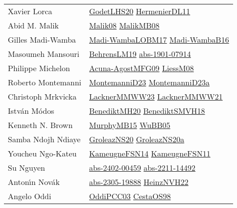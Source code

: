 {\begin{longtable}{p{4cm}p{20cm}}
Xavier Lorca & \href{papers/GodetLHS20.pdf}{GodetLHS20}\cite{GodetLHS20} \href{papers/HermenierDL11.pdf}{HermenierDL11}\cite{HermenierDL11} \\
Abid M. Malik & \href{}{Malik08}\cite{Malik08} \href{articles/MalikMB08.pdf}{MalikMB08}\cite{MalikMB08} \\
Gilles Madi{-}Wamba & \href{papers/Madi-WambaLOBM17.pdf}{Madi-WambaLOBM17}\cite{Madi-WambaLOBM17} \href{papers/Madi-WambaB16.pdf}{Madi-WambaB16}\cite{Madi-WambaB16} \\
Masoumeh Mansouri & \href{papers/BehrensLM19.pdf}{BehrensLM19}\cite{BehrensLM19} \href{articles/abs-1901-07914.pdf}{abs-1901-07914}\cite{abs-1901-07914} \\
Philippe Michelon & \href{papers/Acuna-AgostMFG09.pdf}{Acuna-AgostMFG09}\cite{Acuna-AgostMFG09} \href{articles/LiessM08.pdf}{LiessM08}\cite{LiessM08} \\
Roberto Montemanni & \href{articles/MontemanniD23.pdf}{MontemanniD23}\cite{MontemanniD23} \href{articles/MontemanniD23a.pdf}{MontemanniD23a}\cite{MontemanniD23a} \\
Christoph Mrkvicka & \href{articles/LacknerMMWW23.pdf}{LacknerMMWW23}\cite{LacknerMMWW23} \href{papers/LacknerMMWW21.pdf}{LacknerMMWW21}\cite{LacknerMMWW21} \\
Istv{\'{a}}n M{\'{o}}dos & \href{articles/BenediktMH20.pdf}{BenediktMH20}\cite{BenediktMH20} \href{papers/BenediktSMVH18.pdf}{BenediktSMVH18}\cite{BenediktSMVH18} \\
Kenneth N. Brown & \href{papers/MurphyMB15.pdf}{MurphyMB15}\cite{MurphyMB15} \href{papers/WuBB05.pdf}{WuBB05}\cite{WuBB05} \\
Samba Ndojh Ndiaye & \href{papers/GroleazNS20.pdf}{GroleazNS20}\cite{GroleazNS20} \href{papers/GroleazNS20a.pdf}{GroleazNS20a}\cite{GroleazNS20a} \\
Youcheu Ngo{-}Kateu & \href{articles/KameugneFSN14.pdf}{KameugneFSN14}\cite{KameugneFSN14} \href{papers/KameugneFSN11.pdf}{KameugneFSN11}\cite{KameugneFSN11} \\
Su Nguyen & \href{articles/abs-2402-00459.pdf}{abs-2402-00459}\cite{abs-2402-00459} \href{articles/abs-2211-14492.pdf}{abs-2211-14492}\cite{abs-2211-14492} \\
Anton{\'{\i}}n Nov{\'{a}}k & \href{articles/abs-2305-19888.pdf}{abs-2305-19888}\cite{abs-2305-19888} \href{articles/HeinzNVH22.pdf}{HeinzNVH22}\cite{HeinzNVH22} \\
Angelo Oddi & \href{papers/OddiPCC03.pdf}{OddiPCC03}\cite{OddiPCC03} \href{papers/CestaOS98.pdf}{CestaOS98}\cite{CestaOS98} \\

\end{longtable}}
